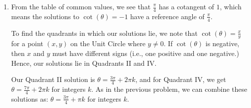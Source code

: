 \documentclass{ximera}
\begin{document}
\begin{example}
\begin{explanation}
\begin{enumerate}
\begin{enumerate}
\item  From the table of common values, we see that $\frac{\pi}{4}$ has a cotangent of $1$, which means the solutions to $\cot(\theta) = -1$ have a reference angle of $\frac{\pi}{4}$. 


To find the quadrants in which our solutions lie, we note that $\cot(\theta) = \frac{x}{y}$ for a point $(x,y)$ on the Unit Circle where $y \neq 0$. If $\cot(\theta)$ is negative, then $x$ and $y$ must have different signs (i.e., one positive and one negative.)  Hence, our solutions lie in Quadrants II and IV.  


Our Quadrant II solution is $\theta = \frac{3\pi}{4} + 2\pi k$, and for Quadrant IV, we get $\theta = \frac{7\pi}{4} + 2\pi k$ for integers $k$.  As in the previous problem, we can combine these solutions as:  $\theta = \frac{3\pi}{4} + \pi k$ for integers $k$.


\begin{image}
\end{image}
\end{enumerate}
\end{enumerate}
\end{explanation}
\end{example}
\end{document}

